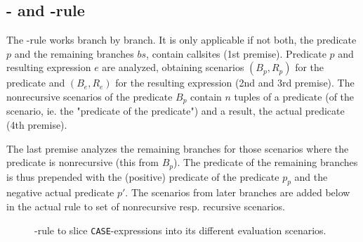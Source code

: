 \subsection{\CASE- and \ELSE-rule}

The \RWHEN-rule works branch by branch. It is only applicable if not both, the predicate $p$ and the remaining branches $bs$, contain callsites (1st premise). Predicate $p$ and resulting expression $e$ are analyzed, obtaining scenarios $(B_p, R_p)$ for the predicate and $(B_e, R_e)$ for the resulting expression (2nd and 3rd premise). The nonrecursive scenarios of the predicate $B_p$ contain $n$ tuples of a predicate (of the scenario, ie. the "predicate of the predicate") and a result, the actual predicate (4th premise).

The last premise analyzes the remaining branches for those scenarios where the predicate is nonrecursive (this from $B_p$). The predicate of the remaining branches is thus prepended with the (positive) predicate of the predicate $p_p$ and the negative actual predicate $p'$. The scenarios from later branches are added below in the actual rule to set of nonrecursive resp. recursive scenarios.

\begin{figure}[h!]
    \centering\small

    \caption{\RWHEN-rule to slice \texttt{CASE}-expressions into its different evaluation scenarios.}
    \label{fig:my_label}
\end{figure}

